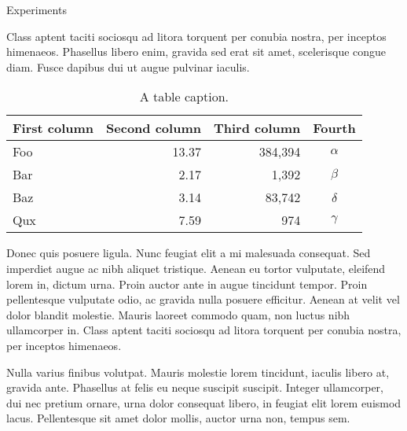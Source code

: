 \begin{block}{Experiments}

Class aptent taciti sociosqu ad litora torquent per conubia nostra, per
inceptos himenaeos. Phasellus libero enim, gravida sed erat sit amet,
scelerisque congue diam. Fusce dapibus dui ut augue pulvinar iaculis.

\begin{table}
  \centering
  \begin{tabular}{l r r c}
    \toprule
    \textbf{First column} & \textbf{Second column} & \textbf{Third column} & \textbf{Fourth} \\
    \midrule
    Foo & 13.37 & 384,394 & $\alpha$ \\
    Bar & 2.17 & 1,392 & $\beta$ \\
    Baz & 3.14 & 83,742 & $\delta$ \\
    Qux & 7.59 & 974 & $\gamma$ \\
    \bottomrule
  \end{tabular}
  \caption{A table caption.}
\end{table}

Donec quis posuere ligula. Nunc feugiat elit a mi malesuada consequat. Sed
imperdiet augue ac nibh aliquet tristique. Aenean eu tortor vulputate,
eleifend lorem in, dictum urna. Proin auctor ante in augue tincidunt
tempor. Proin pellentesque vulputate odio, ac gravida nulla posuere
efficitur. Aenean at velit vel dolor blandit molestie. Mauris laoreet
commodo quam, non luctus nibh ullamcorper in. Class aptent taciti sociosqu
ad litora torquent per conubia nostra, per inceptos himenaeos.

Nulla varius finibus volutpat. Mauris molestie lorem tincidunt, iaculis
libero at, gravida ante. Phasellus at felis eu neque suscipit suscipit.
Integer ullamcorper, dui nec pretium ornare, urna dolor consequat libero,
in feugiat elit lorem euismod lacus. Pellentesque sit amet dolor mollis,
auctor urna non, tempus sem.
\cite{shannon1948communication}

\end{block}
